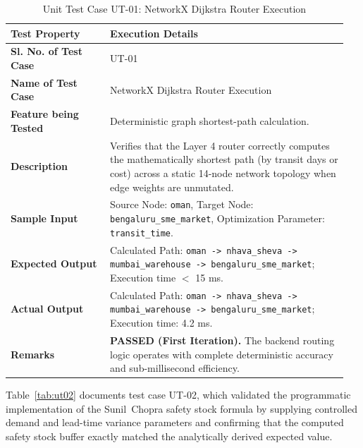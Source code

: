 \begin{table}[H]
    \centering
    \caption{Unit Test Case UT-01: NetworkX Dijkstra Router Execution}
    \label{tab:ut01}
    \begin{tabular}{|p{0.28\linewidth}|p{0.67\linewidth}|}
        \hline
        \textbf{Test Property} & \textbf{Execution Details} \\ \hline
        \textbf{Sl. No. of Test Case} & UT-01 \\ \hline
        \textbf{Name of Test Case} & NetworkX Dijkstra Router Execution \\ \hline
        \textbf{Feature being Tested} & Deterministic graph shortest-path calculation. \\ \hline
        \textbf{Description} & Verifies that the Layer 4 router correctly computes the mathematically shortest path (by transit days or cost) across a static 14-node network topology when edge weights are unmutated. \\ \hline
        \textbf{Sample Input} & Source Node: \texttt{oman}, Target Node: \texttt{bengaluru\_sme\_market}, Optimization Parameter: \texttt{transit\_time}. \\ \hline
        \textbf{Expected Output} & Calculated Path: \texttt{oman -> nhava\_sheva -> mumbai\_warehouse -> bengaluru\_sme\_market}; Execution time $<$ 15 ms. \\ \hline
        \textbf{Actual Output} & Calculated Path: \texttt{oman -> nhava\_sheva -> mumbai\_warehouse -> bengaluru\_sme\_market}; Execution time: 4.2 ms. \\ \hline
        \textbf{Remarks} & \textbf{PASSED (First Iteration).} The backend routing logic operates with complete deterministic accuracy and sub-millisecond efficiency. \\ \hline
    \end{tabular}
\end{table}

Table~\ref{tab:ut02} documents test case UT-02, which validated the programmatic implementation of the Sunil~Chopra safety stock formula by supplying controlled demand and lead-time variance parameters and confirming that the computed safety stock buffer exactly matched the analytically derived expected value.

